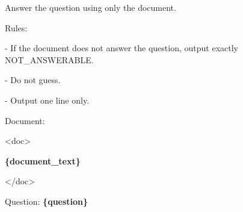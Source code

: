 \begin{tcolorbox}[colback=white, colframe=my-green, coltitle=black, parskip=5mm, title=\textbf{Document-Only Answerability Check}, halign=flush left, enhanced, breakable, skin first=enhanced, skin middle=enhanced, skin last=enhanced]
\begin{scriptsize}
\ttfamily
\setlength{\parindent}{0pt}
Answer the question using only the document.\par
\mbox{}\par
Rules:\par
- If the document does not answer the question, output exactly NOT\_ANSWERABLE.\par
- Do not guess.\par
- Output one line only.\par
\mbox{}\par
Document:\par
\textless{}doc\textgreater{}\par
\textcolor{my-green}{\textbf{\{document\_text\}}}\par
\textless{}/doc\textgreater{}\par
\mbox{}\par
Question: \textcolor{my-green}{\textbf{\{question\}}}\par
\end{scriptsize}
\end{tcolorbox}
